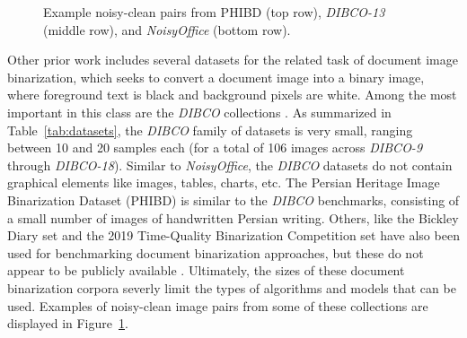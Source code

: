 \documentclass[runningheads]{llncs}
\begin{document}
\begin{figure}
    \centering{}
    \caption{Example noisy-clean pairs from PHIBD (top row), \emph{DIBCO-13} (middle row), and \emph{NoisyOffice} (bottom row).}
    \label{fig:other-dataset-examples}
\end{figure}

Other prior work includes several datasets for the related task of document image binarization, which seeks to convert a document image into a binary image, where foreground text is black and background pixels are white.
Among the most important in this class are the \emph{DIBCO} collections \cite{dibco-09,dibco-10,dibco-11,dibco-12,dibco-13,dibco-14,dibco-16,dibco-17,dibco-18}.
As summarized in Table~\ref{tab:datasets}, the \emph{DIBCO} family of datasets is very small, ranging between 10 and 20 samples each (for a total of 106 images across \emph{DIBCO-9} through \emph{DIBCO-18}).
Similar to \emph{NoisyOffice}, the \emph{DIBCO} datasets do not contain graphical elements like images, tables, charts, etc.
The Persian Heritage Image Binarization Dataset (PHIBD) \cite{phibc-2012-nafchi,nafchi-2013-icdar} is similar to the \emph{DIBCO} benchmarks, consisting of a small number of images of handwritten Persian writing.
Others, like the Bickley Diary set \cite{bickley-diary} and the 2019 Time-Quality Binarization Competition set \cite{2019-time-quality-competition} have also been used for benchmarking document binarization approaches, but these do not appear to be publicly available \cite{tensmeyer-binarization-review-2020}.
Ultimately, the sizes of these document binarization corpora severly limit the types of algorithms and models that can be used.
Examples of noisy-clean image pairs from some of these collections are displayed in Figure~\ref{fig:other-dataset-examples}.
\end{document}
